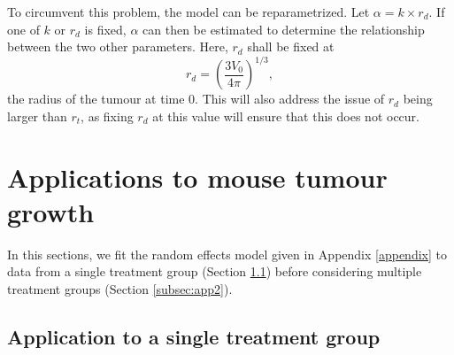 \documentclass[11pt,a4paper]{article}
\begin{document}
To circumvent this problem, the model can be reparametrized. Let $\alpha = k \times r_d$. If one of $k$ or $r_d$ is fixed, $\alpha$ can then be estimated to determine the relationship between the two other parameters. Here, $r_d$ shall be fixed at
\[
r_d = \left(\frac{3V_0}{4 \pi}\right)^{1/3},
\]
the radius of the tumour at time 0. This will also address the issue of $r_d$ being larger than $r_t$, as fixing $r_d$ at this value will ensure that this does not occur.

\section{Applications to mouse tumour growth}
\label{sec:results}

In this sections, we fit the random effects model given in Appendix \ref{appendix} to data from a single treatment group (Section \ref{subsec:app1}) before considering multiple treatment groups (Section \ref{subsec:app2}).

\subsection{Application to a single treatment group}
\label{subsec:app1}
\end{document}
